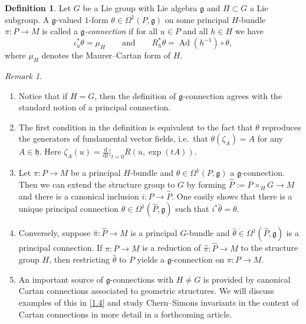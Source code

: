 \documentclass[british,11pt,a4paper]{amsart}
\numberwithin{equation}{section}
\renewcommand\frak{\mathfrak}
\newcommand{\x}{\times}
\newcommand{\Ad}{\operatorname{Ad}}
\renewcommand*{\d}{\mathrm{d}}
\newcommand{\col}{:}
\newcounter{theorem}
\numberwithin{theorem}{section}
\theoremstyle{definition}
\newtheorem{definition}[theorem]{Definition}
\theoremstyle{remark}
\newtheorem{remark}[theorem]{Remark}
\begin{document}
\begin{definition}\label{defn:gconnection}
Let $G$ be a Lie group with Lie algebra $\mathfrak{g}$ and $H\subset G$ a Lie
subgroup. A $\mathfrak{g}$-valued $1$-form $\theta \in \Omega^1(P,\mathfrak{g})$ on
some principal $H$-bundle $\pi \col P \to M$ is called a
\emph{$\mathfrak{g}$-connection} if for all $u\in P$ and all $h \in H$ we
have
\begin{equation}\label{eqn:gvalued1form}
\iota_u^*\theta=\mu_H \qquad \text{and} \qquad R_h^*\theta=\Ad(h^{-1})\circ \theta,
\end{equation}
where $\mu_H$ denotes the Maurer--Cartan form of $H$. 
\end{definition}

\begin{remark}\leavevmode
\begin{enumerate}
\item[(i)] Notice that if $H=G$, then the definition of $\mathfrak{g}$-connection agrees with the standard notion of a principal connection.
\item[(ii)] The first condition in the definition is equivalent to the fact that $\theta$ reproduces the generators of fundamental vector fields, i.e.\ that $\theta(\zeta_A)=A$ for any $A\in\frak{h}$. Here $\zeta_A(u)=\tfrac{\d}{\d t}|_{t=0}R(u,\exp(tA))$. 
\item[(iii)] Let $\pi\col P\to M$ be a principal $H$-bundle and $\theta\in\Omega^1(P,\frak{g})$ a $\mathfrak{g}$-connection. Then we can extend the structure group to $G$ by forming $\hat{P}\col=P\x_H G\to M$ and there is a canonical inclusion $i\col P\to \hat{P}$. One easily shows that there is a unique principal connection $\hat{\theta}\in\Omega^1(\hat{P},\frak{g})$ such that $i^*\hat{\theta}=\theta$.
\item[(iv)] Conversely, suppose $\hat{\pi} \col \hat{P} \to M$ is a principal $G$-bundle and $\hat{\theta} \in \Omega^1(\hat{P},\mathfrak{g})$ is a principal connection. If $\pi \col P \to M$ is a reduction of $\hat{\pi} : \hat{P} \to M$ to the structure group $H$, then restricting $\hat{\theta}$ to $P$ yields a $\mathfrak{g}$-connection on $\pi : P \to M$. 
\item[(v)] An important source of $\mathfrak{g}$-connections with $H\neq G$ is provided by canonical Cartan connections associated to geometric structures. We will discuss examples of this in \cref{1.4} and study Chern--Simons invariants in the context of Cartan connections in more detail in a forthcoming article.
\end{enumerate}
\end{remark}
\end{document}
